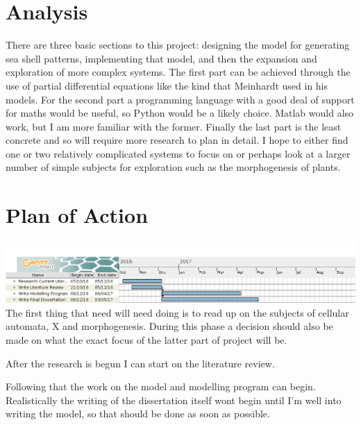 \documentclass[a4paper,11pt]{report}
\begin{document}
\section*{Analysis}
There are three basic sections to this project: designing the model for generating sea shell patterns, implementing that model, and then the expansion and exploration of more complex systems. The first part can be achieved through the use of partial differential equations like the kind that Meinhardt used in his models. For the second part a programming language with a good deal of support for maths would be useful, so Python would be a likely choice. Matlab would also work, but I am more familiar with the former. Finally the last part is the least concrete and so will require more research to plan in detail. I hope to either find one or two relatively complicated systems to focus on or perhaps look at a larger number of simple subjects for exploration such as the morphogenesis of plants.

\section*{Plan of Action}
\includegraphics[width=\textwidth,height=\textheight,keepaspectratio]{plan_of_action.png}
The first thing that need will need doing is to read up on the subjects of cellular automata, X and morphogenesis. During this phase a decision should also be made on what the exact focus of the latter part of project will be.

After the research is begun I can start on the literature review.

Following that the work on the model and modelling program can begin. Realistically the writing of the dissertation itself wont begin until I'm well into writing the model, so that should be done as soon as possible.
\end{document}
